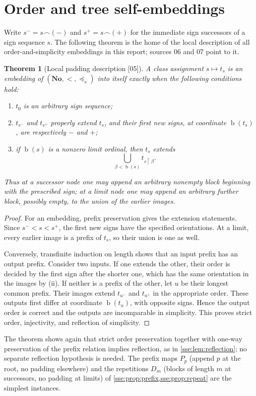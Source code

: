 \documentclass[11pt,a4paper]{article}
\numberwithin{equation}{section}
\theoremstyle{plain}
\newtheorem{theorem}{Theorem}[section]
\theoremstyle{definition}
\theoremstyle{remark}
\newcommand{\No}{\mathbf{No}}
\newcommand{\bday}{\operatorname{b}}
\newcommand{\pref}{\preccurlyeq_s}
\newcommand{\concat}{\mathbin{\frown}}
\newcommand{\src}[1]{\textup{\textsf{\small[#1]}}}%
\begin{document}
\section{Order and tree self-embeddings}\label{sse:co:sec:order}

Write $s^-=s\concat(-)$ and $s^+=s\concat(+)$ for the immediate sign
successors of a sign sequence $s$. The following theorem is the home of the
local description of all order-and-simplicity embeddings in this report;
sources 06 and 07 point to it.

\begin{theorem}[Local padding description \src{05}]\label{sse:co:thm:local}
A class assignment $s\mapsto t_s$ is an embedding of $(\No,<,\pref)$ into
itself exactly when the following conditions hold:
\begin{enumerate}[label=\textup{(\roman*)}]
\item $t_0$ is an arbitrary sign sequence;
\item $t_{s^-}$ and $t_{s^+}$ properly extend $t_s$, and their first new
signs, at coordinate $\bday(t_s)$, are respectively $-$ and $+$;
\item if $\bday(s)$ is a nonzero limit ordinal, then $t_s$ extends
\[
 \bigcup_{\beta<\bday(s)}t_{s\restriction\beta}.
\]
\end{enumerate}
Thus at a successor node one may append an arbitrary nonempty block beginning
with the prescribed sign; at a limit node one may append an arbitrary further
block, possibly empty, to the union of the earlier images.
\end{theorem}
\begin{proof}
For an embedding, prefix preservation gives the extension statements. Since
$s^-<s<s^+$, the first new signs have the specified orientations. At a limit,
every earlier image is a prefix of $t_s$, so their union is one as well.

Conversely, transfinite induction on length shows that an input prefix has
an output prefix. Consider two inputs. If one extends the other, their order
is decided by the first sign after the shorter one, which has the same
orientation in the images by (ii). If neither is a prefix of the other, let
$u$ be their longest common prefix. Their images extend $t_{u^-}$ and
$t_{u^+}$ in the appropriate order. These outputs first differ at
coordinate $\bday(t_u)$, with opposite signs. Hence the output order is
correct and the outputs are incomparable in simplicity. This proves strict
order, injectivity, and reflection of simplicity.
\end{proof}
The theorem shows again that strict order preservation together with
one-way preservation of the prefix relation implies reflection, as in
\cref{sse:lem:reflection}; no separate reflection hypothesis is needed.
The prefix maps $P_p$ (append $p$ at the root, no padding elsewhere) and the
repetitions $D_m$ (blocks of length $m$ at successors, no padding at limits)
of \cref{sse:prop:prefix,sse:prop:repeat} are the simplest instances.
\end{document}
